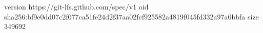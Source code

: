 version https://git-lfs.github.com/spec/v1
oid sha256:bf9e0dd07c2f077ca51fe24d2f37aa02fcf925582a4819f045fd332a97a6bbfa
size 349692
